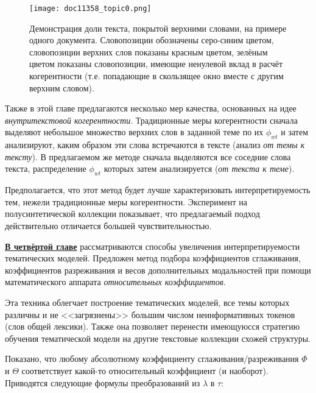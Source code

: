 \begin{figure}
        \texttt{[image: doc11358\_topic0.png]} %
    \captionsetup{justification=raggedright,singlelinecheck=false,format=hang}
    \caption{Демонстрация доли текста, покрытой верхними словами, на примере одного документа. Словопозиции обозначены серо-синим цветом, словопозиции верхних слов показаны красным цветом, зелёным цветом показаны словопозиции, имеющие ненулевой вклад в расчёт когерентности (т.е. попадающие в скользящее окно вместе с другим верхним словом).}
\label{fig:ch3_doc_compound_auto}
\end{figure}

Также в этой главе предлагаются несколько мер качества, основанных на идее \textit{внутритекстовой когерентности}.
Традиционные меры когерентности сначала выделяют небольшое множество верхних слов в заданной теме по их $\phi_{wt}$ и затем анализируют, каким образом эти слова встречаются в тексте (анализ \emph{от темы к тексту}). В предлагаемом же методе сначала выделяются все соседние слова текста, распределение $\phi_{wt}$ которых затем анализируется (\emph{от текста к теме}).

Предполагается, что этот метод будет лучше характеризовать интерпретируемость тем, нежели традиционные меры когерентности. Эксперимент на полусинтетической коллекции показывает, что предлагаемый подход действительно отличается большей чувствительностью.

\underline{\textbf{В четвёртой главе}} рассматриваются способы увеличения интерпретируемости тематических моделей. Предложен метод подбора коэффициентов сглаживания, коэффициентов разреживания и весов дополнительных модальностей при помощи математического аппарата \textit{относительных коэффициентов}.

Эта техника облегчает построение тематических моделей, все темы которых различны и не <<загрязнены>> большим числом неинформативных токенов (слов общей лексики). Также она позволяет перенести имеющуюсся стратегию обучения тематической модели на другие текстовые коллекции схожей структуры.

Показано, что любому абсолютному коэффициенту сглаживания/разреживания $\Phi$ и $\Theta$ соответствует какой-то относительный коэффициент (и наоборот). Приводятся следующие формулы преобразований из $\lambda$ в $\tau$:

